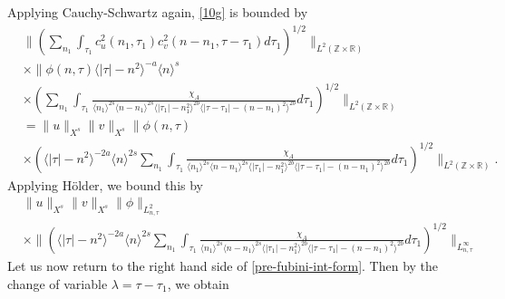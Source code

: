 \documentclass[12pt,reqno]{amsart}
\numberwithin{equation}{section}  %
\newcommand{\rr}{\mathbb{R}}
\newcommand{\zz}{\mathbb{Z}}
\begin{document}
%
%
Applying Cauchy-Schwartz again, \eqref{10g} is bounded by
%
%
\begin{equation*}
  \begin{split}
    & \|\left( \sum_{n_{1} }\int_{\tau_{1} } c_{u}^{2}(n_1, \tau_1)
  c_{v}^{2} (n - n_1, \tau - \tau_{1} ) d \tau_1  \right)^{1/2} \|_{L^{2}(\zz \times
		\rr)}
		\\
    & \times  \|\phi(n, \tau) \langle | \tau | - n^{2} \rangle ^{-a} \langle n
    \rangle ^{s}
		\\
    & \times \left( \sum_{n_{1}} \int_{\tau_{1}} \frac{\chi_{A}}{ \langle n_{1}
    \rangle ^{2s} \langle n-n_{1} \rangle ^{2s} \langle | \tau_{1}|-n_{1}^{2}
    \rangle^{2b} \langle  |\tau -
    \tau_{1} | -(n - n_{1})^{2}
    \rangle^{2b} } d \tau_1 \right)^{1/2} \|_{L^2(\zz \times \rr)}
		\\
    & = \|u\|_{X^{s}} \|v\|_{X^{s}} \label{holder-term}
     \|\phi(n, \tau)     \\
    & \times \left( \langle | \tau | - n^{2} \rangle ^{-2a} \langle n
    \rangle ^{2s}
    \sum_{n_{1}} \int_{\tau_{1}} \frac{\chi_{A}}{ \langle n_{1} \rangle ^{2s} \langle
n-n_{1} \rangle ^{2s}  \langle | \tau_{1}|-n_{1}^{2} \rangle^{2b} \langle  |\tau -
    \tau_{1} | -(n - n_{1})^{2}
    \rangle^{2b} } d \tau_1 \right)^{1/2} \|_{L^2(\zz \times \rr)}.
  \end{split}
\end{equation*}
%
Applying H{\"o}lder, we bound this by 
%
%
\begin{equation}
  \label{integral-bound-1st-form-per}
	\begin{split}
    & \|u\|_{X^{s}} \|v\|_{X^{s}} \| \phi \|_{L^{2}_{n, \tau}}
    \\
    & \times \|\left( \langle | \tau | - n^{2} \rangle ^{-2a} \langle n
    \rangle ^{2s}
    \sum_{n_{1}} \int_{\tau_{1}} \frac{\chi_{A}}{ \langle n_{1} \rangle ^{2s} \langle
n-n_{1} \rangle ^{2s} \langle | \tau_{1}|-n_{1}^{2} \rangle^{2b} \langle  |\tau -
    \tau_{1} | -(n - n_{1})^{2}
    \rangle^{2b}  } d \tau_1 \right)^{1/2} \|_{L^\infty_{n, \tau}}
	\end{split}
\end{equation}
%
%
Let us now return to the right hand side of \eqref{pre-fubini-int-form}.
Then by the change of variable $\lambda =
\tau - \tau_{1}$, we obtain
\end{document}

